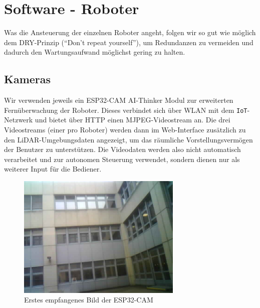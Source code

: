 
\section{Software - Roboter}
\label{sec:software_robots}
Was die Ansteuerung der einzelnen Roboter angeht, folgen wir so gut wie möglich dem DRY-Prinzip (``Don't repeat yourself''),
um Redundanzen zu vermeiden und dadurch den Wartungsaufwand möglichst gering zu halten.

\subsection{Kameras}
\label{subsec:robots_cams}
Wir verwenden jeweils ein ESP32-CAM AI-Thinker Modul zur erweiterten
Fernüberwachung der Roboter.
%
Dieses verbindet sich über WLAN mit dem \texttt{IoT}-Netzwerk und bietet über HTTP einen MJPEG-Videostream an.
%
Die drei Videostreams (einer pro Roboter) werden dann im Web-Interface
zusätzlich zu den LiDAR-Umgebungsdaten angezeigt,
um das räumliche Vorstellungsvermögen der Benutzer zu unterstützen.
%
Die Videodaten werden also nicht automatisch verarbeitet und zur autonomen Steuerung verwendet,
sondern dienen nur als weiterer Input für die Bediener.
\begin{figure}[H]
    \includegraphics[width=0.7\textwidth, center]{img/cam_erstes_bild.png}
    \caption{Erstes empfangenes Bild der ESP32-CAM}
    \label{fig:cam_erstes_bild}
\end{figure}


